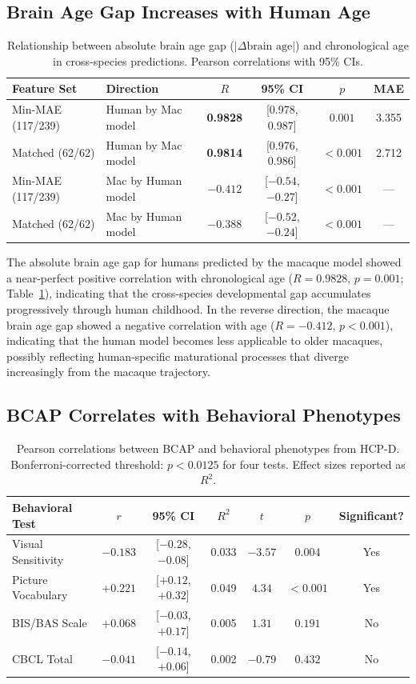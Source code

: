 \documentclass[11pt]{article}
\begin{document}
\subsection{Brain Age Gap Increases with Human Age}

\begin{table}[H]
\centering
\caption{Relationship between absolute brain age gap ($|\Delta\text{brain age}|$) and chronological age in cross-species predictions. Pearson correlations with 95\% CIs.}
\label{tab:gap_age}
\begin{tabular}{llcccc}
\toprule
Feature Set & Direction & $R$ & 95\% CI & $p$ & MAE \\
\midrule
Min-MAE (117/239) & Human by Mac model & \textbf{0.9828} & [0.978, 0.987] & $0.001$ & 3.355 \\
Matched (62/62) & Human by Mac model & \textbf{0.9814} & [0.976, 0.986] & $< 0.001$ & 2.712 \\
Min-MAE (117/239) & Mac by Human model & $-0.412$ & [$-0.54$, $-0.27$] & $< 0.001$ & --- \\
Matched (62/62) & Mac by Human model & $-0.388$ & [$-0.52$, $-0.24$] & $< 0.001$ & --- \\
\bottomrule
\end{tabular}
\end{table}

The absolute brain age gap for humans predicted by the macaque model showed a near-perfect positive correlation with chronological age ($R = 0.9828$, $p = 0.001$; Table~\ref{tab:gap_age}), indicating that the cross-species developmental gap accumulates progressively through human childhood. In the reverse direction, the macaque brain age gap showed a negative correlation with age ($R = -0.412$, $p < 0.001$), indicating that the human model becomes less applicable to older macaques, possibly reflecting human-specific maturational processes that diverge increasingly from the macaque trajectory.

\subsection{BCAP Correlates with Behavioral Phenotypes}

\begin{table}[H]
\centering
\caption{Pearson correlations between BCAP and behavioral phenotypes from HCP-D. Bonferroni-corrected threshold: $p < 0.0125$ for four tests. Effect sizes reported as $R^2$.}
\label{tab:bcap_behavior}
\begin{tabular}{lcccccc}
\toprule
Behavioral Test & $r$ & 95\% CI & $R^2$ & $t$ & $p$ & Significant? \\
\midrule
Visual Sensitivity & $-0.183$ & [$-0.28$, $-0.08$] & 0.033 & $-3.57$ & $0.004$ & Yes \\
Picture Vocabulary & $+0.221$ & [$+0.12$, $+0.32$] & 0.049 & $4.34$ & $< 0.001$ & Yes \\
BIS/BAS Scale & $+0.068$ & [$-0.03$, $+0.17$] & 0.005 & $1.31$ & $0.191$ & No \\
CBCL Total & $-0.041$ & [$-0.14$, $+0.06$] & 0.002 & $-0.79$ & $0.432$ & No \\
\bottomrule
\end{tabular}
\end{table}
\end{document}
